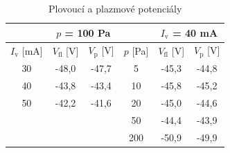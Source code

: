 \documentclass[a4paper,12pt]{article}
\begin{document}
\begin{center}
	\begin{table}[h!]
		\centering
		\caption{Plovoucí a plazmové potenciály}
		\label{tab1}
		\begin{tabular}{|c|c|c|c|c|c|} \hline
			\multicolumn{1}{|c|}{}  & \multicolumn{2}{c|}{$p$ = 100 \si{\pascal}}& \multicolumn{1}{|c|}{} & \multicolumn{2}{c|}{$I_\text{v}$ = 40 \si{\milli\ampere} }  \\ \hline
			$I_\text{v}$ [\si{\milli\ampere}] &  $V_\text{fl}$ [V] & $V_\text{p}$ [V] & $p$ [\si{\pascal}] &  $V_\text{fl}$ [V] & $V_\text{p}$ [V] \\ \hline
			30 & -48,0 & -47,7 & 5 & -45,3 & -44,8\\ \hline
			40 & -43,8 & -43,4 & 10 & -45,8 & -45,2 \\ \hline
			50 & -42,2 & -41,6 & 20 & -45,0 & -44,6 \\ \hline
			&  &  & 50 & -44,4 & -43,9 \\ \hline
			& &  & 200 & -50,9 & -49,9 \\ \hline
			
		\end{tabular}
	\end{table}
\end{center}
\end{document}
